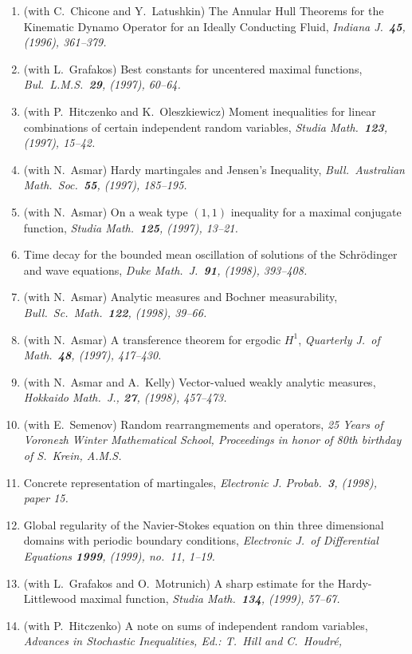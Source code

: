 \documentclass{article}
\begin{document}
\begin{enumerate}
{(1996), 235--252.}
\item (with C.~Chicone and Y.~Latushkin) The Annular Hull Theorems for the 
Kinematic Dynamo Operator for an Ideally Conducting Fluid, {\em
Indiana J.\ {\bf 45}, (1996), 361--379.}
\item (with L.~Grafakos) Best constants for uncentered maximal functions, 
{\em 
Bul.\ L.M.S.\ {\bf 29}, (1997), 60--64.}
\item (with P.~Hitczenko and K.~Oleszkiewicz) Moment inequalities for linear
combinations of certain independent random variables, {\em
Studia Math.\ {\bf 123}, (1997), 15--42.}
\item (with N.~Asmar) Hardy martingales and Jensen's Inequality, {\em
Bull.\ Australian Math.\ Soc.\ {\bf 55}, (1997), 185--195.}
\item (with N.~Asmar)
On a weak type $(1,1)$ inequality for a maximal conjugate
function, {\em Studia Math.\ {\bf 125}, (1997),
13--21.}
\item Time decay for the bounded mean oscillation of solutions of
the Schr\"odinger and wave equations, {\em Duke Math.\
J.\ {\bf 91}, (1998), 393--408.}
\item (with N.~Asmar)
Analytic measures and Bochner measurability, {\em
Bull.\ Sc.\ Math.\ {\bf 122}, (1998), 39--66.}
\item (with N.~Asmar) A transference theorem for ergodic $H^1$,
{\em Quarterly J.\ of Math.\ {\bf 48}, (1997), 417--430.}
\item (with N.~Asmar and A.~Kelly) Vector-valued weakly analytic measures,
{\em Hokkaido Math.\ J., {\bf 27}, (1998), 457--473.}
\item (with E.~Semenov) Random rearrangmements and operators, {\em
25 Years of Voronezh Winter Mathematical School, Proceedings in
honor of 80th birthday of S.~Krein, A.M.S.}
\item Concrete representation of martingales,
{\em Electronic J. Probab.\ {\bf 3}, (1998), paper 15.}
\item Global regularity of the Navier-Stokes equation on thin
three dimensional domains with periodic boundary conditions,
{\em Electronic J.\ of Differential Equations {\bf 1999}, (1999), no.\ 11,
1--19.}
\item (with L.~Grafakos and O.~Motrunich) A sharp estimate for the
Hardy-Littlewood maximal function, {\em
Studia Math.\ {\bf 134}, (1999), 57--67.}
\item (with P.~Hitczenko) A note on sums of independent random variables,
{\em Advances in Stochastic Inequalities, Ed.: T.~Hill and C.~Houdr\'e,
}
\end{enumerate}
\end{document}
